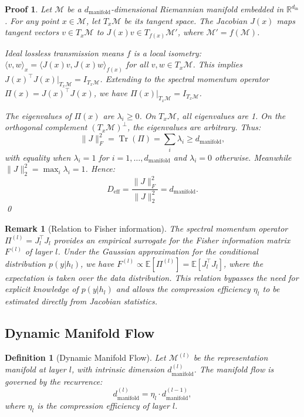 \documentclass[11pt, a4paper]{article}
\newtheorem{dfn}[theo]{Definition}
\theoremstyle{plain}
\newtheorem*{remark}{Remark}
\newtheorem*{pf}{Proof}
\def\R{{\mathbb R}}
\DeclareMathOperator{\Tr}{Tr}
\def\sM{{\mathcal M}}
\begin{document}
\begin{pf}
Let $\sM$ be a $d_{\text{manifold}}$-dimensional Riemannian manifold embedded in $\R^{d_{\text{in}}}$. For any point $x \in \sM$, let $T_x\sM$ be its tangent space. The Jacobian $J(x)$ maps tangent vectors $v \in T_x\sM$ to $J(x)v \in T_{f(x)}\sM'$, where $\sM' = f(\sM)$.

Ideal lossless transmission means $f$ is a local isometry: $\langle v, w\rangle_x = \langle J(x)v, J(x)w\rangle_{f(x)}$ for all $v,w \in T_x\sM$. This implies $J(x)^\top J(x)|_{T_x\sM} = I_{T_x\sM}$. Extending to the spectral momentum operator $\Pi(x) = J(x)^\top J(x)$, we have $\Pi(x)|_{T_x\sM} = I_{T_x\sM}$.

The eigenvalues of $\Pi(x)$ are $\lambda_i \geq 0$. On $T_x\sM$, all eigenvalues are 1. On the orthogonal complement $(T_x\sM)^\perp$, the eigenvalues are arbitrary. Thus:
\begin{equation}
\|J\|_F^2 = \Tr(\Pi) = \sum_i \lambda_i \geq d_{\text{manifold}},
\end{equation}
with equality when $\lambda_i = 1$ for $i=1,\ldots,d_{\text{manifold}}$ and $\lambda_i = 0$ otherwise. Meanwhile $\|J\|_2^2 = \max_i \lambda_i = 1$. Hence:
\begin{equation}
D_{\text{eff}} = \frac{\|J\|_F^2}{\|J\|_2^2} = d_{\text{manifold}}.
\end{equation}
\qed
\end{pf}

\begin{remark}[Relation to Fisher information]
The spectral momentum operator $\Pi^{(l)} = J_l^\top J_l$ provides an empirical surrogate for the Fisher information matrix $F^{(l)}$ of layer $l$. Under the Gaussian approximation for the conditional distribution $p(y|h_l)$, we have $F^{(l)} \propto \mathbb{E}[\Pi^{(l)}] = \mathbb{E}[J_l^\top J_l]$, where the expectation is taken over the data distribution. This relation bypasses the need for explicit knowledge of $p(y|h_l)$ and allows the compression efficiency $\eta_l$ to be estimated directly from Jacobian statistics.
\end{remark}

\subsection{Dynamic Manifold Flow}

\begin{dfn}[Dynamic Manifold Flow]\label{dfn:manifold_flow}
Let $\sM^{(l)}$ be the representation manifold at layer $l$, with intrinsic dimension $d_{\text{manifold}}^{(l)}$. The manifold flow is governed by the recurrence:
\begin{equation}
d_{\text{manifold}}^{(l)} = \eta_l \cdot d_{\text{manifold}}^{(l-1)},
\label{eq:manifold_flow}
\end{equation}
where $\eta_l$ is the compression efficiency of layer $l$.
\end{dfn}
\end{document}

